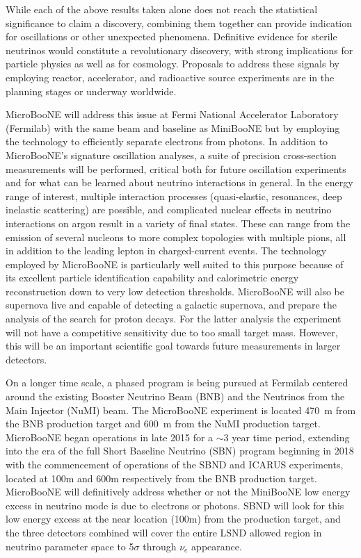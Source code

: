While each of the above results taken alone does not reach the statistical significance to claim a discovery, combining them together can provide indication for oscillations or other unexpected phenomena. Definitive evidence for sterile neutrinos would constitute a revolutionary discovery, with strong implications for particle physics as well as for cosmology. Proposals to address these signals by employing reactor, accelerator, and radioactive source experiments are in the planning stages or underway worldwide. 
 
MicroBooNE will address this issue at Fermi National Accelerator Laboratory (Fermilab) with the same beam and baseline as MiniBooNE but by employing the \lartpc technology to efficiently separate electrons from photons.  In addition to MicroBooNE's signature oscillation analyses, a suite of precision cross-section measurements will be performed, critical both for future \lartpc oscillation experiments and for what can be learned about neutrino interactions in general.   In the energy range of interest, multiple interaction processes (quasi-elastic, resonances, deep inelastic scattering) are possible, and complicated nuclear effects in neutrino interactions on argon result in a variety of final states. These can range from the emission of several nucleons to more complex topologies with multiple pions, all in addition to the leading lepton in charged-current events. The \lartpc technology employed by MicroBooNE is particularly well suited to this purpose because of its excellent particle identification capability and calorimetric energy reconstruction down to very low detection thresholds. MicroBooNE will also be supernova live and capable of detecting a galactic supernova, and prepare the analysis of  the search for proton decays. For the latter analysis the experiment will not have a competitive sensitivity due to too small target mass. However, this will be an important scientific goal towards future measurements in larger detectors.  

On a longer time scale, a phased program is being pursued at Fermilab centered around the existing Booster Neutrino Beam (BNB) and the Neutrinos from the Main Injector (NuMI) beam. The MicroBooNE experiment is located 470~m from the BNB production target and 600~m from the NuMI production target.  MicroBooNE began operations in late 2015 for a $\sim$3 year time period, extending into the era of the full Short Baseline Neutrino (SBN) program beginning in 2018 with the commencement of operations of the SBND \cite{send} and ICARUS experiments, located at 100m and 600m respectively from the BNB production target.  MicroBooNE will definitively address whether or not the MiniBooNE low energy excess in neutrino mode is due to electrons or photons.  SBND will look for this low energy excess at the near location (100m) from the production target, and the three detectors combined will cover the entire LSND allowed region in neutrino parameter space to 5$\sigma$ through $\nu_e$ appearance.

